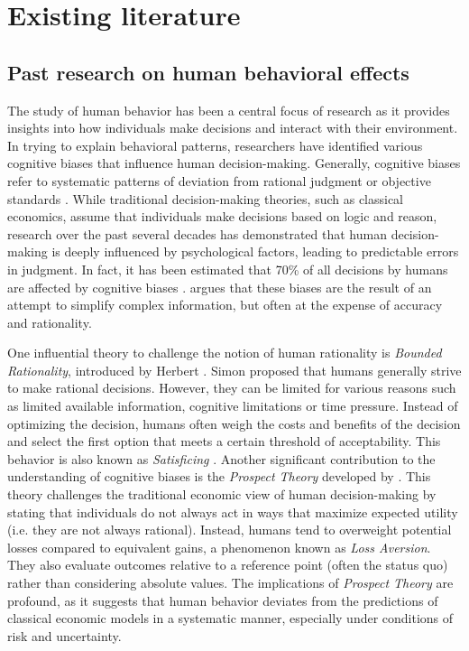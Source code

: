 \section{Existing literature}
\label{chapter:theoreticalbackground}

\subsection{Past research on human behavioral effects}
\par The study of human behavior has been a central focus of research as it provides insights into how individuals make decisions and interact with their environment. In trying to explain behavioral patterns, researchers have identified various cognitive biases that influence human decision-making. Generally, cognitive biases refer to systematic patterns of deviation from rational judgment or objective standards \parencite{tversky1974judgment}. While traditional decision-making theories, such as classical economics, assume that individuals make decisions based on logic and reason, research over the past several decades has demonstrated that human decision-making is deeply influenced by psychological factors, leading to predictable errors in judgment. In fact, it has been estimated that 70\% of all decisions by humans are affected by cognitive biases \parencite{juarez2018analyzing}. \textcite{kahneman2017thinking} argues that these biases are the result of an attempt to simplify complex information, but often at the expense of accuracy and rationality.

\par One influential theory to challenge the notion of human rationality is \textit{Bounded Rationality}, introduced by Herbert \textcite{simon1955behavioral, simon1990bounded}. Simon proposed that humans generally strive to make rational decisions. However, they can be limited for various reasons such as limited available information, cognitive limitations or time pressure. Instead of optimizing the decision, humans often weigh the costs and benefits of the decision and select the first option that meets a certain threshold of acceptability. This behavior is also known as \textit{Satisficing} \parencite{simon1955behavioral, simon1990bounded}. Another significant contribution to the understanding of cognitive biases is the \textit{Prospect Theory} developed by \textcite{kahneman1979prospect}. This theory challenges the traditional economic view of human decision-making by stating that individuals do not always act in ways that maximize expected utility (i.e. they are not always rational). Instead, humans tend to overweight potential losses compared to equivalent gains, a phenomenon known as \textit{Loss Aversion}. They also evaluate outcomes relative to a reference point (often the status quo) rather than considering absolute values. The implications of \textit{Prospect Theory} are profound, as it suggests that human behavior deviates from the predictions of classical economic models in a systematic manner, especially under conditions of risk and uncertainty.

